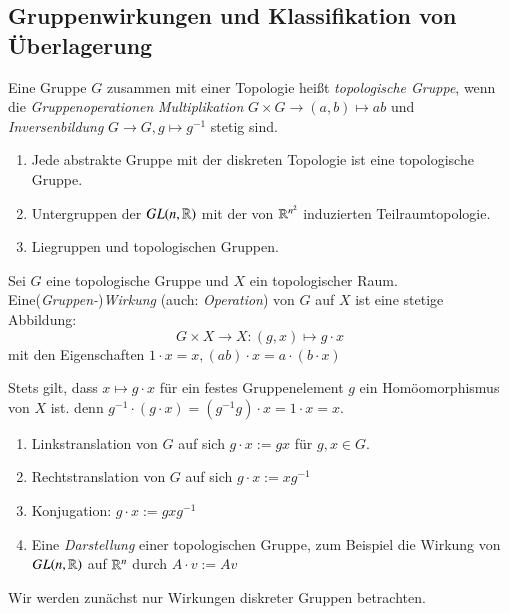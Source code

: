 \documentclass[a4paper,10pt]{scrartcl}
\begin{document}
\subsection{Gruppenwirkungen und Klassifikation von Überlagerung}
\begin{df}
 Eine Gruppe $G$ zusammen mit einer Topologie heißt \emph{topologische Gruppe}, wenn die \emph{Gruppenoperationen} \emph{Multiplikation} $G\times G \to (a,b)\mapsto ab$ und \emph{Inversenbildung}
$G\to G, g\mapsto g^{-1}$ stetig sind.
\end{df}
\begin{exs*}
 \begin{enumerate}[1)]
  \item Jede abstrakte Gruppe mit der diskreten Topologie ist eine topologische Gruppe.
  \item Untergruppen der $GL(n, \mathbb{R})$ mit der von $\mathbb{R}^{n^2}$ induzierten Teilraumtopologie.  
  \item Liegruppen und topologischen Gruppen.
 \end{enumerate}
\end{exs*}
\begin{df}\label{thm2:3.2}
 Sei $G$ eine topologische Gruppe und $X$ ein topologischer Raum. Eine(\emph{Gruppen-})\emph{Wirkung} (auch: \emph{Operation}) von $G$ auf $X$ ist eine stetige Abbildung:
\[
 G\times X\to X: (g,x) \mapsto g\cdot x
\]
mit den Eigenschaften $1\cdot x = x, (ab)\cdot x=a\cdot (b\cdot x)$
\end{df}
\begin{note*}
 Stets gilt, dass $x\mapsto g\cdot x$ für ein festes Gruppenelement $g$ ein Homöomorphismus von $X$ ist. denn $g^{-1} \cdot (g\cdot x)=(g^{-1}g)\cdot x=1\cdot x=x.$
\end{note*}
\begin{exs*}
 \begin{enumerate}[1)]
  \item Linkstranslation von $G$ auf sich $g\cdot x:=gx$ für $g,x\in G$.
  \item Rechtstranslation von $G$ auf sich $g\cdot x:=xg^{-1}$
  \item Konjugation: $g \cdot x := gxg^{-1}$
  \item Eine \emph{Darstellung} einer topologischen Gruppe, zum Beispiel die Wirkung von $GL(n, \mathbb{R})$ auf $\mathbb{R}^n$ durch $A \cdot v := Av$
 \end{enumerate}
\end{exs*}
Wir werden zunächst nur Wirkungen diskreter Gruppen betrachten.
\end{document}
